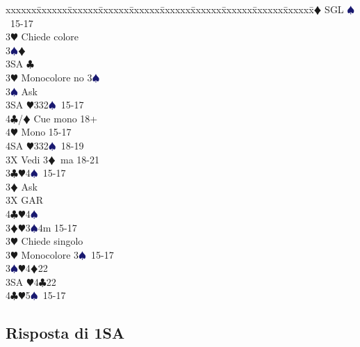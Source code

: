 \documentclass[a4paper,italian]{article}
\newcommand{\BC}{\textcolor{OliveGreen}{$\clubsuit$}}
\newcommand{\BD}{\textcolor{RedOrange}{$\vardiamondsuit$}}
\newcommand{\BH}{\textcolor{Red2}{$\varheartsuit${}}}
\newcommand{\BS}{\textcolor{MidnightBlue}{$\spadesuit${}}}
\newenvironment{bidtable}
{\begin{tabbing}

    xxxxxx\=xxxxxx\=xxxxxx\=xxxxxx\=xxxxxx\=xxxxxx\=xxxxxx\=xxxxxx\=xxxxxx\=xxxxxx\=\kill}
{\end{tabbing} }%
\begin{document}
\begin{multicols*}{2}
\begin{bidtable}
                                            3\BD \> SGL \BS\ 15-17\+\\
                                            3\BH \> Chiede colore\+\\
                                            3\BS {}\BD \\
                                            3SA \BC \-\-\\
                                            3\BH \> Monocolore no 3\BS \+\\
                                            3\BS \> Ask\+\\
                                            3SA \BH 332\BS\ 15-17\\
                                            4\BC/\BD \> Cue mono 18+\\
                                            4\BH \> Mono 15-17\\
                                            4SA \BH 332\BS\ 18-19\-\-\\
                                            3X \> Vedi 3\BD\ ma 18-21\-\-\\
                                            3\BC {}\BH 4\BS\ 15-17\+\\
                                            3\BD \> Ask\+\\
                                            3X \> GAR\\
                                            4\BC {}\BH 4\BS \-\-\\
                                            3\BD {}\BH 3\BS 4m 15-17\+\\
                                            3\BH \> Chiede singolo\-\\
                                            3\BH \> Monocolore 3\BS\ 15-17\\
                                            3\BS {}\BH 4\BD 22\\
                                            3SA \BH 4\BC 22\\
                                            4\BC {}\BH 5\BS\ 15-17\-\\
                                        \end{bidtable}
                                        \columnbreak
                                        \subsection{Risposta di 1SA}

\end{multicols*}
\end{document}
